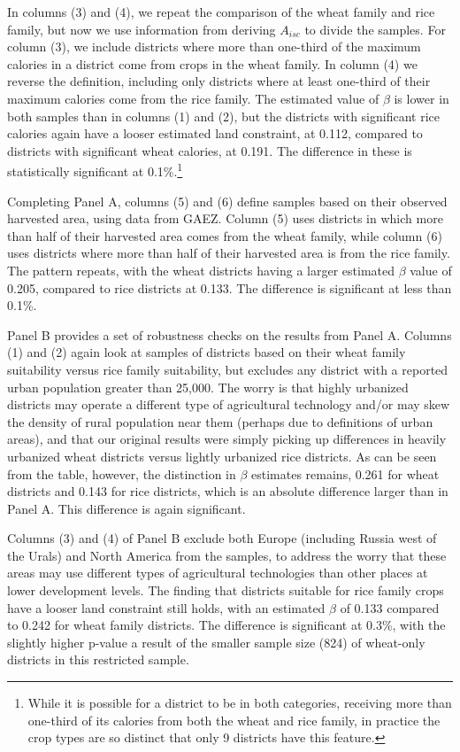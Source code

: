 \documentclass[11pt]{article}
\begin{document}
In columns (3) and (4), we repeat the comparison of the wheat family and rice family, but now we use information from deriving $A_{isc}$ to divide the samples. For column (3), we include districts where more than one-third of the maximum calories in a district come from crops in the wheat family. In column (4) we reverse the definition, including only districts where at least one-third of their maximum calories come from the rice family. The estimated value of $\beta$ is lower in both samples than in columns (1) and (2), but the districts with significant rice calories again have a looser estimated land constraint, at 0.112, compared to districts with significant wheat calories, at 0.191. The difference in these is statistically significant at 0.1\%.\footnote{While it is possible for a district to be in both categories, receiving more than one-third of its calories from both the wheat and rice family, in practice the crop types are so distinct that only 9 districts have this feature.}

Completing Panel A, columns (5) and (6) define samples based on their observed harvested area, using data from GAEZ. Column (5) uses districts in which more than half of their harvested area comes from the wheat family, while column (6) uses districts where more than half of their harvested area is from the rice family. The pattern repeats, with the wheat districts having a larger estimated $\beta$ value of 0.205, compared to rice districts at 0.133. The difference is significant at less than 0.1\%.

Panel B provides a set of robustness checks on the results from Panel A. Columns (1) and (2) again look at samples of districts based on their wheat family suitability versus rice family suitability, but excludes any district with a reported urban population greater than 25,000. The worry is that highly urbanized districts may operate a different type of agricultural technology and/or may skew the density of rural population near them (perhaps due to definitions of urban areas), and that our original results were simply picking up differences in heavily urbanized wheat districts versus lightly urbanized rice districts. As can be seen from the table, however, the distinction in $\beta$ estimates remains, 0.261 for wheat districts and 0.143 for rice districts, which is an absolute difference larger than in Panel A. This difference is again significant.

Columns (3) and (4) of Panel B exclude both Europe (including Russia west of the Urals) and North America from the samples, to address the worry that these areas may use different types of agricultural technologies than other places at lower development levels. The finding that districts suitable for rice family crops have a looser land constraint still holds, with an estimated $\beta$ of 0.133 compared to 0.242 for wheat family districts. The difference is significant at 0.3\%, with the slightly higher p-value a result of the smaller sample size (824) of wheat-only districts in this restricted sample.
\end{document}

